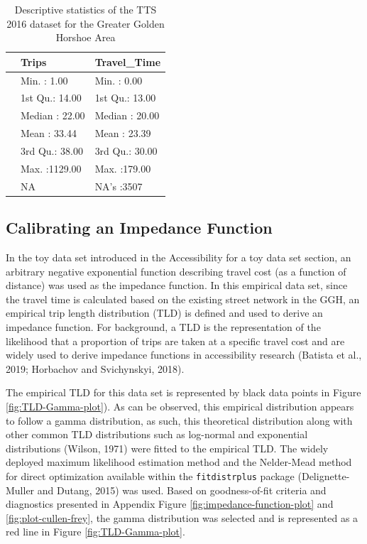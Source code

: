 \documentclass[]{elsarticle} %
\begin{document}
\begin{table}

\caption{\label{tab:unnamed-chunk-1}\label{tab:TTS-16-desc-stats}Descriptive statistics of the TTS 2016 dataset for the Greater Golden Horshoe Area}
\centering
\begin{tabular}[t]{l|l|l}
\hline
  & Trips & Travel\_Time\\
\hline
 & Min.   :   1.00 & Min.   :  0.00\\
\hline
 & 1st Qu.:  14.00 & 1st Qu.: 13.00\\
\hline
 & Median :  22.00 & Median : 20.00\\
\hline
 & Mean   :  33.44 & Mean   : 23.39\\
\hline
 & 3rd Qu.:  38.00 & 3rd Qu.: 30.00\\
\hline
 & Max.   :1129.00 & Max.   :179.00\\
\hline
 & NA & NA's   :3507\\
\hline
\end{tabular}
\end{table}

\hypertarget{calibrating-an-impedance-function}{%
\subsection{Calibrating an Impedance
Function}\label{calibrating-an-impedance-function}}

In the toy data set introduced in the
\protect\hypertarget{accessibility-numerical-example}{}{Accessibility
for a toy data set} section, an arbitrary negative exponential function
describing travel cost (as a function of distance) was used as the
impedance function. In this empirical data set, since the travel time is
calculated based on the existing street network in the GGH, an empirical
trip length distribution (TLD) is defined and used to derive an
impedance function. For background, a TLD is the representation of the
likelihood that a proportion of trips are taken at a specific travel
cost and are widely used to derive impedance functions in accessibility
research (Batista et al., 2019; Horbachov and Svichynskyi, 2018).

The empirical TLD for this data set is represented by black data points
in Figure \ref{fig:TLD-Gamma-plot}). As can be observed, this empirical
distribution appears to follow a gamma distribution, as such, this
theoretical distribution along with other common TLD distributions such
as log-normal and exponential distributions (Wilson, 1971) were fitted
to the empirical TLD. The widely deployed maximum likelihood estimation
method and the Nelder-Mead method for direct optimization available
within the \texttt{fitdistrplus} package (Delignette-Muller and Dutang,
2015) was used. Based on goodness-of-fit criteria and diagnostics
presented in Appendix Figure \ref{fig:impedance-function-plot} and
\ref{fig:plot-cullen-frey}, the gamma distribution was selected and is
represented as a red line in Figure \ref{fig:TLD-Gamma-plot}.
\end{document}
